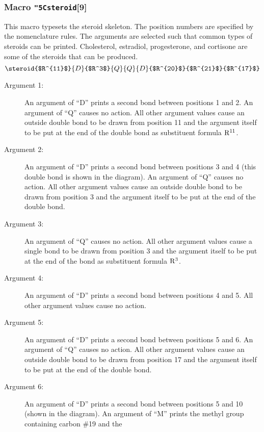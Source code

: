 \subsubsection{Macro {\tt\char"5C{}steroid}[9]}
  This macro typesets the steroid skeleton. The position
 numbers are specified by the nomenclature rules. The
 arguments are selected such that common types of steroids
 can be printed. Cholesterol, estradiol, progesterone,
 and cortisone are some of the steroids that can be produced.
   
 \[ \steroid{$R^{11}$}{D}{$R^3$}{Q}{Q}{D}{$R^{20}$}
     {$R^{21}$}{$R^{17}$}  \]
 
   
 \begin{description}
 \item[{\rm Argument 1:}] An argument of ``D''
      prints a second bond between positions 1 and 2.
      An argument of ``Q'' causes no action. All other
      argument values cause an outside double bond to be
      drawn from position 11 and the argument itself to be
      put at the end of the double bond as substituent
      formula ${\rm R^{11}}$.
 \item[{\rm Argument 2:}] An argument of ``D''
      prints a second bond between positions 3 and 4
      (this double bond is shown in the diagram).
      An argument of ``Q'' causes no action. All other
      argument values cause an outside double bond to be
      drawn from position 3 and the argument itself to be
      put at the end of the double bond.
 \item[{\rm Argument 3:}] An argument of ``Q''
      causes no action. All other argument values cause
      a single bond to be drawn from position 3 and the
      argument itself to be put at the end of the bond
      as substituent formula ${\rm R^3}$.
 \item[{\rm Argument 4:}] An argument of ``D''
      prints a second bond between positions 4 and 5.
      All other argument values cause no action.
 \item[{\rm Argument 5:}] An argument of ``D''
      prints a second bond between positions 5 and 6.
      An argument of ``Q'' causes no action. All other
      argument values cause an outside double bond
      to be drawn from position 17 and the argument
      itself to be put at the end of the double bond.
 \item[{\rm Argument 6:}] An argument of ``D''
      prints a second bond between positions 5 and 10
      (shown in the diagram). An argument of ``M''
      prints the methyl group containing carbon \#19 and the

\end{description}
